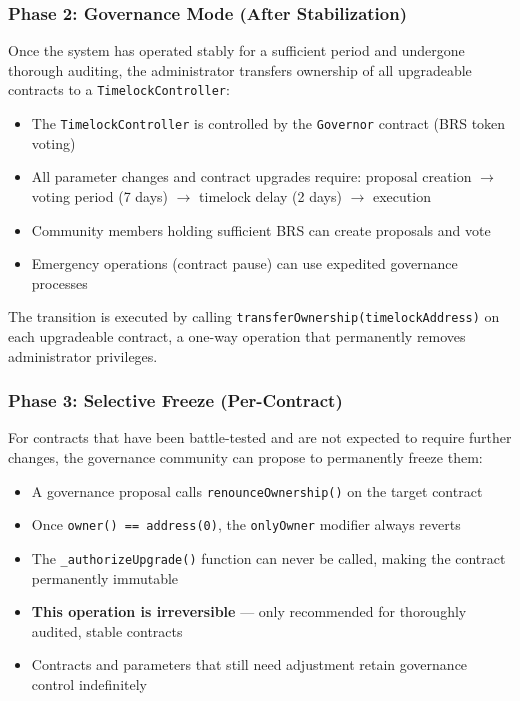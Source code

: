\documentclass{article}
\begin{document}
\subsubsection{Phase 2: Governance Mode (After Stabilization)}
Once the system has operated stably for a sufficient period and undergone thorough auditing, the administrator transfers ownership of all upgradeable contracts to a \texttt{TimelockController}:
\begin{itemize}
  \item The \texttt{TimelockController} is controlled by the \texttt{Governor} contract (BRS token voting)
  \item All parameter changes and contract upgrades require: proposal creation $\rightarrow$ voting period (7 days) $\rightarrow$ timelock delay (2 days) $\rightarrow$ execution
  \item Community members holding sufficient BRS can create proposals and vote
  \item Emergency operations (contract pause) can use expedited governance processes
\end{itemize}
The transition is executed by calling \texttt{transferOwnership(timelockAddress)} on each upgradeable contract, a one-way operation that permanently removes administrator privileges.

\subsubsection{Phase 3: Selective Freeze (Per-Contract)}
For contracts that have been battle-tested and are not expected to require further changes, the governance community can propose to permanently freeze them:
\begin{itemize}
  \item A governance proposal calls \texttt{renounceOwnership()} on the target contract
  \item Once \texttt{owner() == address(0)}, the \texttt{onlyOwner} modifier always reverts
  \item The \texttt{\_authorizeUpgrade()} function can never be called, making the contract permanently immutable
  \item \textbf{This operation is irreversible} --- only recommended for thoroughly audited, stable contracts
  \item Contracts and parameters that still need adjustment retain governance control indefinitely
\end{itemize}
\end{document}
